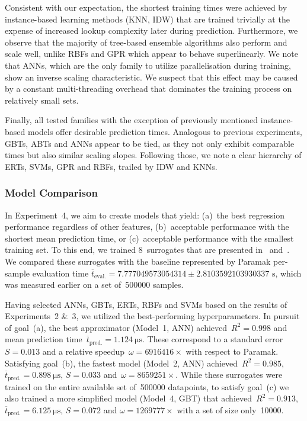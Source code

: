 Consistent with our expectation, the shortest training times were achieved by
instance-based learning methods (KNN, IDW) that
are trained trivially at the expense of increased lookup complexity later during prediction.
Furthermore, we observe that the majority of tree-based ensemble algorithms also perform
and scale well, unlike RBFs and GPR which appear to behave superlinearly. We note that ANNs,
which are the only family to utilize parallelisation during training, show an
inverse scaling characteristic. We suspect that this effect may be caused
by a constant multi-threading overhead that dominates the training process
on relatively small sets.

Finally, all tested families with the exception of previously mentioned instance-based
models offer desirable prediction times. Analogous to previous experiments,
GBTs, ABTs and ANNs appear to be tied, as they not only exhibit
comparable times but also similar scaling slopes. Following those, we note a
clear hierarchy of ERTs, SVMs, GPR and RBFs, trailed by IDW and KNNs.


\subsubsection{Model Comparison}
\label{sec:res-exp4}
{
In Experiment~4, we aim to create models that yield:
(a)~the best regression performance regardless
of other features, (b)~acceptable performance with the shortest mean
prediction time, or (c)~acceptable performance with the smallest training set.
To this end, we trained 8~surrogates that are presented in~
and~. We compared these
surrogates with the baseline represented by Paramak per-sample evaluation time $\overline{t}_{\text{eval.}}=\num{7.777049573054314} \pm
\num{2.8103592103930337} \text{ s}$, which was measured earlier on a set of~\num{500000} samples.
}

Having selected ANNs, GBTs, ERTs, RBFs and SVMs based on the results of
Experiments~2 \&~3, we utilized the best-performing hyperparameters.
In pursuit of goal~(a), the best approximator (Model~1,
ANN) achieved~$R^2=\num{0.998}$ and mean prediction
time~$\overline{t}_{\text{pred.}}=\SI{1.124}{\micro\second}$. These correspond
to a standard error~$S=\num{0.013}$ and a relative speedup~$\omega=\num{6916416} \times$
with respect to Paramak. Satisfying
goal~(b), the fastest model (Model~2, ANN) achieved~$R^2=\num{0.985}$,
$\overline{t}_{\text{pred.}}=\SI{0.898}{\micro\second}$, $S=\num{0.033}$
and~$\omega=\num{8659251} \times$.
While these surrogates
were trained on the entire available set of~\num{500000} datapoints, to satisfy
goal~(c) we also trained a more simplified model (Model~4, GBT)
that achieved~$R^2=\num{0.913}$,
$\overline{t}_{\text{pred.}}=\SI{6.125}{\micro\second}$, $S=\num{0.072}$ and $\omega=\num{1269777} \times$
with a set of size only~\num{10000}.

